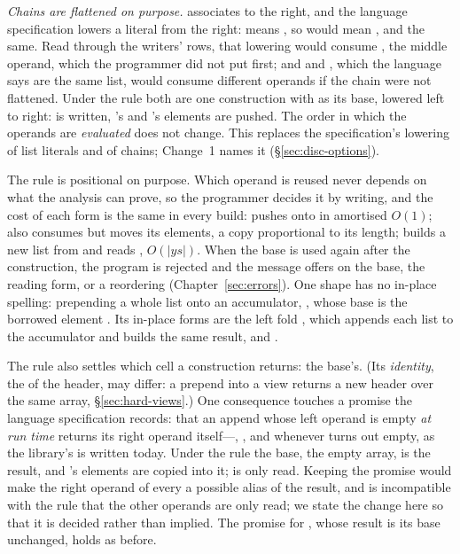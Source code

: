 \emph{Chains are flattened on purpose.} \code{++} associates to the right, and the language
specification lowers a literal from the right: \code{[ x, …a, y ]} means
, so \code{[ …a, …b, …c ]} would mean
, and  the same. Read through the writers' rows,
that lowering would consume , the middle operand, which the programmer did not put first; and
 and \code{[ …a, …b, …c ]}, which the language says are the same list, would consume
different operands if the chain were not flattened. Under the rule both are one construction with
 as its base, lowered left to right:  is written, 's and 's elements
are pushed. The order in which the operands are \emph{evaluated} does not change. This replaces the
specification's lowering of list literals and of \code{++} chains; Change~1 names it
(\S\ref{sec:disc-options}).

The rule is positional on purpose. Which operand is reused never depends on what the analysis can
prove, so the programmer decides it by writing, and the cost of each form is the same in every build:
\code{[ …acc, x ]} pushes onto  in amortised $O(1)$; \code{[ x, …acc ]} also consumes  but moves its elements, a copy proportional to its length;  builds a new list from
\code{[ x ]} and reads , $O(|\mathit{ys}|)$. When the base is used again after the construction,
the program is rejected and the message offers  on the base, the reading form, or a
reordering (Chapter~\ref{sec:errors}). One shape has no in-place spelling: prepending a whole list onto
an accumulator, , whose base is the borrowed element
. Its in-place forms are the left fold , which
appends each list to the accumulator and builds the same result, and .

The rule also settles which cell a construction returns: the base's. (Its \emph{identity}, the
\code{===} of the header, may differ: a prepend into a view returns a new header over the same array,
\S\ref{sec:hard-views}.) One consequence touches a promise the language specification records: that an
append whose left operand is empty \emph{at run time} returns its right operand itself---,
\code{[ …[], …ys ]}, and  whenever  turns out empty, as the library's
 is written today. Under the rule the base, the empty array, is the result, and
's elements are copied into it;  is only read. Keeping the promise would make the right
operand of every \code{++} a possible alias of the result, and is incompatible with the rule that the
other operands are only read; we state the change here so that it is decided rather than implied. The
promise for , whose result is its base unchanged, holds as before.

